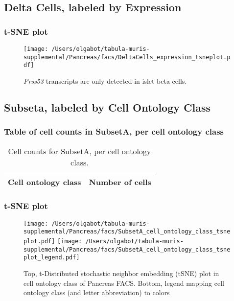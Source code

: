 \clearpage
\subsection{Delta Cells, labeled by Expression}

\clearpage
\subsubsection{t-SNE plot}
\begin{figure}[h]
\centering
\texttt{[image: /Users/olgabot/tabula-muris-supplemental/Pancreas/facs/DeltaCells\_expression\_tsneplot.pdf]}

\caption{\emph{Prss53} transcripts are only detected in islet beta cells.
}
\end{figure}


\clearpage
\subsection{Subseta, labeled by Cell Ontology Class}
\subsubsection{Table of cell counts in SubsetA, per cell ontology class}\begin{table}[h]
\centering
\label{my-label}
\begin{tabular}{@{}ll@{}}
\toprule

Cell ontology class& Number of cells \\ \midrule\bottomrule
\end{tabular}
\caption{Cell counts for SubsetA, per cell ontology class.}
\end{table}

\clearpage
\subsubsection{t-SNE plot}
\begin{figure}[h]
\centering
\texttt{[image: /Users/olgabot/tabula-muris-supplemental/Pancreas/facs/SubsetA\_cell\_ontology\_class\_tsneplot.pdf]}
\texttt{[image: /Users/olgabot/tabula-muris-supplemental/Pancreas/facs/SubsetA\_cell\_ontology\_class\_tsneplot\_legend.pdf]}
\caption{Top, t-Distributed stochastic neighbor embedding (tSNE) plot  in cell ontology class of Pancreas FACS. Bottom, legend mapping cell ontology class (and letter abbreviation) to colors}
\end{figure}


